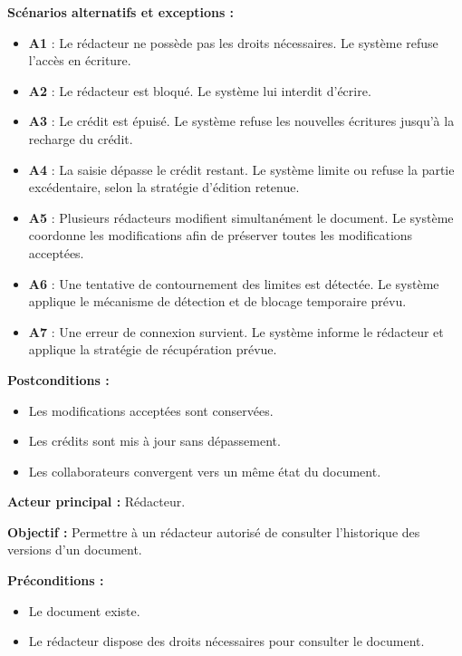 \begin{description}[leftmargin=0pt, style=nextline, font=\normalfont\bfseries\color{violetprincipal}]
    \textbf{Scénarios alternatifs et exceptions :}
    \begin{itemize}
        \item \textbf{A1} : Le rédacteur ne possède pas les droits nécessaires. Le système refuse l'accès en écriture.
        \item \textbf{A2} : Le rédacteur est bloqué. Le système lui interdit d'écrire.
        \item \textbf{A3} : Le crédit est épuisé. Le système refuse les nouvelles écritures jusqu'à la recharge du crédit.
        \item \textbf{A4} : La saisie dépasse le crédit restant. Le système limite ou refuse la partie excédentaire, selon la stratégie d'édition retenue.
        \item \textbf{A5} : Plusieurs rédacteurs modifient simultanément le document. Le système coordonne les modifications afin de préserver toutes les modifications acceptées.
        \item \textbf{A6} : Une tentative de contournement des limites est détectée. Le système applique le mécanisme de détection et de blocage temporaire prévu.
        \item \textbf{A7} : Une erreur de connexion survient. Le système informe le rédacteur et applique la stratégie de récupération prévue.
    \end{itemize}

    \textbf{Postconditions :}
    \begin{itemize}
        \item Les modifications acceptées sont conservées.
        \item Les crédits sont mis à jour sans dépassement.
        \item Les collaborateurs convergent vers un même état du document.
    \end{itemize}

    \item[UC05 --- Consulter les versions]

    \textbf{Acteur principal :} Rédacteur.

    \textbf{Objectif :} Permettre à un rédacteur autorisé de consulter l'historique des versions d'un document.

    \textbf{Préconditions :}
    \begin{itemize}
        \item Le document existe.
        \item Le rédacteur dispose des droits nécessaires pour consulter le document.
    \end{itemize}


\end{description}
